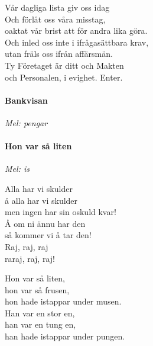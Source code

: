 \documentclass[12pt]{article}
\begin{document}
\begin{minipage}{.45\textwidth}
	\noindent
	Vår dagliga lista giv oss idag\\
	Och förlåt oss våra misstag,\\
	oaktat vår brist att för andra lika göra.\\
	Och inled oss inte i ifrågasättbara krav,\\
	utan fräls oss ifrån affärsmän.\\
	
	\noindent
	Ty Företaget är ditt och Makten\\
	och Personalen, i evighet. Enter.\\

	\vspace{4.6cm}
	
	
\end{minipage}
\newpage

\noindent
\begin{minipage}{.45\textwidth}
	\paragraph*{Bankvisan\\}
	\vspace{3px}
	\textit{Mel: pengar}\\
\end{minipage}%
\hspace{0.1\textwidth}
\noindent
\begin{minipage}{.45\textwidth}
	\paragraph*{Hon var så liten\\}
	\vspace{3px}
	\textit{Mel: is}\\
\end{minipage}
\noindent
\begin{minipage}{.45\textwidth}
	
	Alla har vi skulder\\
	å alla har vi skulder\\
	men ingen har sin oskuld kvar!\\
	Å om ni ännu har den\\
	så kommer vi å tar den!\\
	Raj, raj, raj\\
	raraj, raj, raj!\\
\end{minipage}%
\hspace{0.1\textwidth}
\noindent
\begin{minipage}{.45\textwidth}
	Hon var så liten,\\
	hon var så frusen,\\
	hon hade istappar under musen.\\
	
	\noindent
	Han var en stor en,\\
	han var en tung en,\\
	han hade istappar under pungen.\\
\end{minipage}
\end{document}
